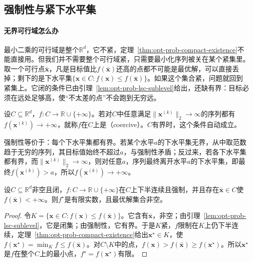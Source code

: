 \subsection{强制性与紧下水平集}
\label{sec:opt-prob-coercive}

\paragraph{无界可行域怎么办}
最小二乘的可行域是整个$\mathbb R^d$，它不紧，定理~\ref{thm:opt-prob-compact-existence}不能直接用。但我们并不需要整个可行域紧，只需要最小化序列被关在某个紧集里。取一个可行点$\bar{\bm x}$，凡是目标值比$f(\bar{\bm x})$还高的点都不可能是最优解，可以直接丢掉；剩下的是下水平集$\{\bm x\in C:f(\bm x)\leq f(\bar{\bm x})\}$。如果这个集合紧，问题就回到紧集上。它闭的条件已由引理~\ref{lem:opt-prob-lsc-sublevel}给出，还缺有界：目标必须在远处足够高，使“不太差的点”不会跑到无穷远。

\begin{definition}[强制性]
\label{def:opt-prob-coercive}
设$C\subseteq\mathbb R^d$，$f:C\to\mathbb R\cup\{+\infty\}$。若对$C$中任意满足$\lVert\bm x^{(k)}\rVert_2\to\infty$的序列都有$f(\bm x^{(k)})\to+\infty$，就称$f$在$C$上是（coercive）。$C$有界时，这个条件自动成立。
\end{definition}

强制性等价于：每个下水平集都有界。若某个水平$a$的下水平集无界，从中取范数趋于无穷的序列，其目标值始终不超过$a$，与强制性矛盾；反过来，若各下水平集都有界，而$\lVert\bm x^{(k)}\rVert_2\to\infty$，则对任意$a$，序列最终离开水平$a$的下水平集，即最终$f(\bm x^{(k)})>a$，所以$f(\bm x^{(k)})\to+\infty$。

\begin{theorem}[强制目标的最小值]
\label{thm:opt-prob-coercive-existence}
设$C\subseteq\mathbb R^d$非空且闭，$f:C\to\mathbb R\cup\{+\infty\}$在$C$上下半连续且强制，并且存在$\bar{\bm x}\in C$使$f(\bar{\bm x})<+\infty$。则$f^\star$是有限实数，且最优解集合非空。
\end{theorem}

\begin{proof}
令$K=\{\bm x\in C:f(\bm x)\leq f(\bar{\bm x})\}$。它含有$\bar{\bm x}$，非空；由引理~\ref{lem:opt-prob-lsc-sublevel}，它是闭集；由强制性，它有界。于是$K$紧，$f$限制在$K$上仍下半连续，定理~\ref{thm:opt-prob-compact-existence}给出$\bm x^\star\in K$，使$f(\bm x^\star)=\min_Kf\leq f(\bar{\bm x})$。对$C\setminus K$中的点，$f(\bm x)>f(\bar{\bm x})\geq f(\bm x^\star)$。所以$\bm x^\star$是$f$在整个$C$上的最小点，$f^\star=f(\bm x^\star)$有限。
\end{proof}


